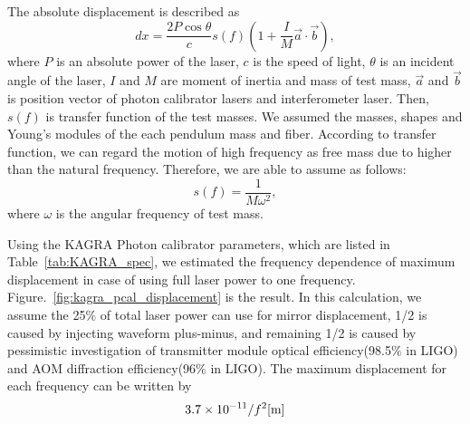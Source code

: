 
The absolute displacement is described as
\begin{equation}
dx=\frac{2 P \cos{\theta}}{c} s(f) \left( 1+\frac{I}{M}\vec{a}\cdot \vec{b}\right), \label{eq:dx}
\end{equation}
where $P$ is an absolute power of the laser, $c$ is the speed of light, $\theta$  is an incident angle of the laser, $I$ and $M$ are moment of inertia and mass of test mass, $\vec{a}$ and $\vec{b}$ is position vector of photon calibrator lasers and interferometer laser. Then, $s(f)$ is transfer function of the test masses. 
We assumed the masses, shapes and Young's modules of the each pendulum mass and fiber. %
According to transfer function, we can regard the motion of high frequency as free mass due to higher than the natural frequency. Therefore, we are able to assume as follows:
\begin{equation}
s(f)=\frac{1}{M \omega^2},
\end{equation}
where $\omega$ is the angular frequency of test mass.

Using the KAGRA Photon calibrator parameters, which are listed in Table~\ref{tab:KAGRA_spec}, we estimated the frequency dependence of maximum displacement 
in case of using full laser power to one frequency. 
Figure.~\ref{fig:kagra_pcal_displacement} is the result.
In this calculation, we assume the 25$\%$ of total laser power can use for mirror displacement, 
1/2 is caused by injecting waveform plus-minus, 
and remaining 1/2 is caused by pessimistic investigation of 
transmitter module optical efficiency(98.5$\%$ in LIGO) and
AOM diffraction efficiency(96$\%$ in LIGO).
The maximum displacement for each frequency can be written by 
\begin{equation}
3.7 \times 10^{-11}/f^2 {\rm   [m]}
\end{equation}

